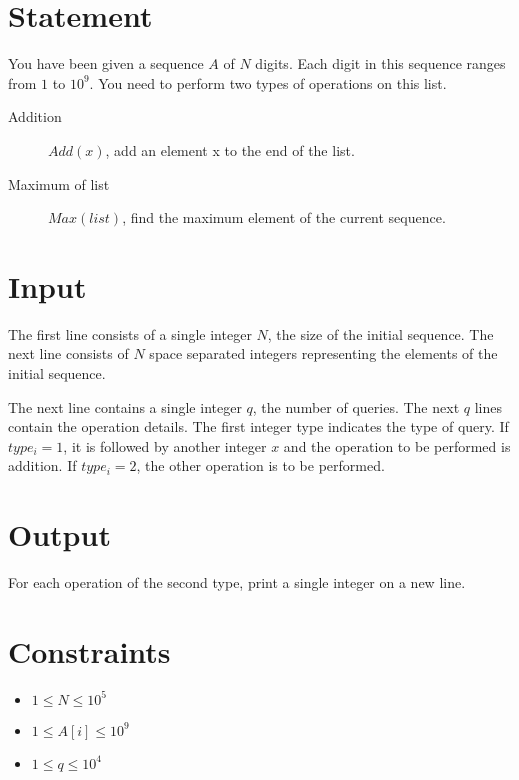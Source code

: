 \documentclass{article}
\begin{document}
\section*{Statement}

You have been given a sequence $A$ of $N$ digits. Each digit in this sequence ranges from $1$ to $10^{9}$. You need to perform two types of operations on this list.

\begin{description}
    \item[Addition] $Add(x)$, add an element x to the end of the list.
    \item[Maximum of list] $Max(list)$, find the maximum element of the current sequence.
\end{description}

\section*{Input}

The first line consists of a single integer $N$, the size of the initial sequence. The next line consists of $N$ space separated integers representing the elements of the initial sequence.

The next line contains a single integer $q$, the number of queries. The next $q$ lines contain the operation details. The first integer type indicates the type of query. If $type_{i} = 1$, it is followed by another integer $x$ and the operation to be performed is addition. If $type_{i} = 2$, the other operation is to be performed.

\section*{Output}

For each operation of the second type, print a single integer on a new line. 

\section*{Constraints}

\begin{itemize}
    \item $1 \le N \le 10^{5}$
    \item $1 \le A[i] \le 10^{9}$
    \item $1 \le q \le 10^{4}$
\end{itemize}
\end{document}
